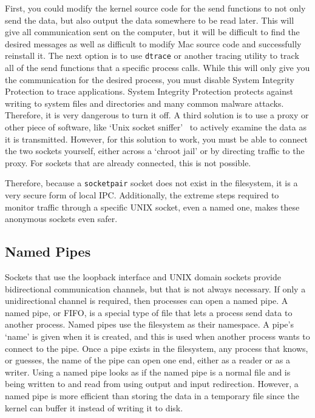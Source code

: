First, you could modify the kernel source code for the send functions to not only send the data, but also output the data somewhere to be read later.  This will give all communication sent on the computer, but it will be difficult to find the desired messages as well as difficult to modify Mac source code and successfully reinstall it.  The next option is to use \texttt{dtrace} or another tracing utility to track all of the send functions that a specific process calls.  While this will only give you the communication for the desired process, you must disable System Integrity Protection to trace applications.  System Integrity Protection protects against writing to system files and directories and many common malware attacks.  Therefore, it is very dangerous to turn it off.  A third solution is to use a proxy or other piece of software, like `Unix socket sniffer'~\cite{socketSniffer} to actively examine the data as it is transmitted.  However, for this solution to work, you must be able to connect the two sockets yourself, either across a `chroot jail' or by directing traffic to the proxy.  For sockets that are already connected, this is not possible.

Therefore, because a \texttt{socketpair} socket does not exist in the filesystem, it is a very secure form of local IPC.  Additionally, the extreme steps required to monitor traffic through a specific UNIX socket, even a named one, makes these anonymous sockets even safer.

\subsection{Named Pipes}
\label{sec:namedPipes}
Sockets that use the loopback interface and UNIX domain sockets provide bidirectional communication channels, but that is not always necessary.  If only a unidirectional channel is required, then processes can open a named pipe.  A named pipe, or FIFO, is a special type of file that lets a process send data to another process.  Named pipes use the filesystem as their namespace.  A pipe's `name' is given when it is created, and this is used when another process wants to connect to the pipe.  Once a pipe exists in the filesystem, any process that knows, or guesses, the name of the pipe can open one end, either as a reader or as a writer.  Using a named pipe looks as if the named pipe is a normal file and is being written to and read from using output and input redirection.  However, a named pipe is more efficient than storing the data in a temporary file since the kernel can buffer it instead of writing it to disk.

